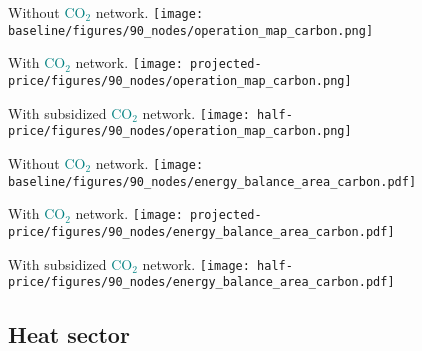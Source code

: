 \documentclass[12pt, aspectratio=169]{beamer}
\newcommand{\carbon}{\textcolor{teal}{CO$_2$}}
\begin{document}
\begin{frame}
    \begin{center}
    Without \carbon{} network.
    \texttt{[image: baseline/figures/90\_nodes/operation\_map\_carbon.png]}
    \end{center}
\end{frame}



\begin{frame}
    \begin{center}
    With \carbon{} network.
    \texttt{[image: projected-price/figures/90\_nodes/operation\_map\_carbon.png]}
    \end{center}
\end{frame}


\begin{frame}
    \begin{center}
    With subsidized \carbon{} network.
    \texttt{[image: half-price/figures/90\_nodes/operation\_map\_carbon.png]}
    \end{center}
\end{frame}



\begin{frame}
    \begin{center}
    Without \carbon{} network.
    \texttt{[image: baseline/figures/90\_nodes/energy\_balance\_area\_carbon.pdf]}
    \end{center}
\end{frame}


\begin{frame}
    \begin{center}
    With \carbon{} network.
    \texttt{[image: projected-price/figures/90\_nodes/energy\_balance\_area\_carbon.pdf]}
    \end{center}
\end{frame}


\begin{frame}
    \begin{center}
    With subsidized \carbon{} network.
    \texttt{[image: half-price/figures/90\_nodes/energy\_balance\_area\_carbon.pdf]}
    \end{center}
\end{frame}


\subsection*{Heat sector}
\end{document}
